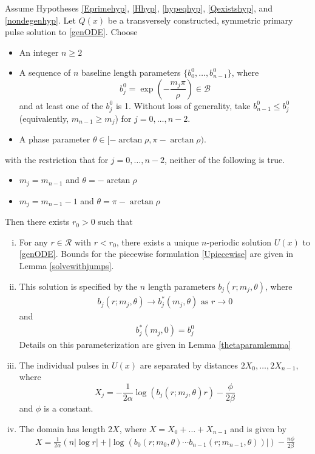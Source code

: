 \documentclass[thesis.tex]{subfiles}
\begin{document}
\begin{theorem}\label{perexist}
Assume Hypotheses \ref{Eprimehyp}, \ref{Hhyp}, \ref{hypeqhyp}, \ref{Qexistshyp}, and \ref{nondegenhyp}. Let $Q(x)$ be a transversely constructed, symmetric primary pulse solution to \eqref{genODE}. Choose
\begin{itemize}
\item An integer $n \geq 2$ 
\item A sequence of $n$ baseline length parameters $\{ b_0^0, \dots, b_{n-1}^0 \}$, where 
\[
b_j^0 = \exp\left(-\frac{m_j \pi}{\rho}\right) \in \mathcal{B}
\]
and at least one of the $b_j^0$ is 1. Without loss of generality, take $b_{n-1}^0 \leq b_j^0$ (equivalently, $m_{n-1} \geq m_j$) for $j = 0, \dots, n-2$.
\item A phase parameter $\theta \in [-\arctan \rho, \pi - \arctan \rho)$.
\end{itemize}
with the restriction that for $j = 0, \dots, n-2$, neither of the following is true.
\begin{itemize}
\item $m_j = m_{n-1}$ and $\theta = -\arctan \rho$
\item $m_j = m_{n-1} - 1$ and $\theta = \pi-\arctan \rho$
\end{itemize}
Then there exists $r_0 > 0$ such that
\begin{enumerate}[(i)]

\item For any $r \in \mathcal{R}$ with $r < r_0$, there exists a unique $n$-periodic solution $U(x)$ to \eqref{genODE}. Bounds for the piecewise formulation \eqref{Upiecewise} are given in Lemma \ref{solvewithjumps}.

\item This solution is specified by the $n$ length parameters $b_j(r; m_j, \theta)$, where
\begin{align}
b_j(r; m_j, \theta) \rightarrow b^*_j(m_j, \theta) \text{ as } r \rightarrow 0
\end{align}
and
\begin{align}
b^*_j(m_j, 0) = b_j^0
\end{align}
Details on this parameterization are given in Lemma \ref{thetaparamlemma}

\item The individual pulses in $U(x)$ are separated by distances $2 X_0, \dots, 2 X_{n-1}$, where 
\begin{equation}\label{Xj}
X_j = -\frac{1}{2\alpha}\log(b_j(r; m_j, \theta) r) - \frac{\phi}{2 \beta} 
\end{equation}
and $\phi$ is a constant.

\item The domain has length $2X$, where $X = X_0 + \dots + X_{n-1}$ and is given by
\begin{align}
X = \frac{1}{2\alpha} \left(n |\log r| + |\log(b_0(r; m_0, \theta) \cdots b_{n-1}(r; m_{n-1}, \theta))| \right) - \frac{n \phi}{2 \beta}
\end{align}

\end{enumerate}
\end{theorem}
\end{document}
